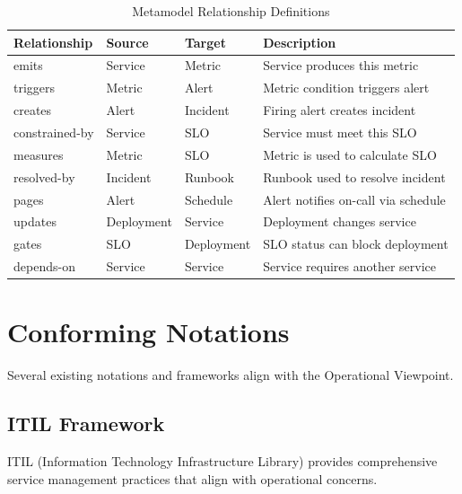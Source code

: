 \documentclass[11pt,letterpaper]{article}
\begin{document}
\begin{table}[H]
\centering
\caption{Metamodel Relationship Definitions}
\small
\begin{tabular}{@{}L{2.3cm}L{1.8cm}L{1.8cm}L{7.5cm}@{}}
\toprule
\textbf{Relationship} & \textbf{Source} & \textbf{Target} & \textbf{Description} \\
\midrule
emits & Service & Metric & Service produces this metric \\
\addlinespace
triggers & Metric & Alert & Metric condition triggers alert \\
\addlinespace
creates & Alert & Incident & Firing alert creates incident \\
\addlinespace
constrained-by & Service & SLO & Service must meet this SLO \\
\addlinespace
measures & Metric & SLO & Metric is used to calculate SLO \\
\addlinespace
resolved-by & Incident & Runbook & Runbook used to resolve incident \\
\addlinespace
pages & Alert & Schedule & Alert notifies on-call via schedule \\
\addlinespace
updates & Deployment & Service & Deployment changes service \\
\addlinespace
gates & SLO & Deployment & SLO status can block deployment \\
\addlinespace
depends-on & Service & Service & Service requires another service \\
\bottomrule
\end{tabular}
\end{table}

\section{Conforming Notations}

Several existing notations and frameworks align with the Operational Viewpoint.

\subsection{ITIL Framework}

ITIL (Information Technology Infrastructure Library) provides comprehensive service management practices that align with operational concerns.
\end{document}
